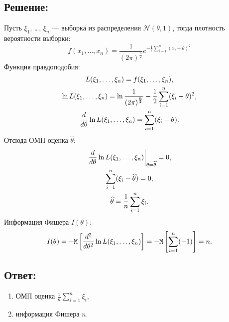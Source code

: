 \documentclass[12pt]{article}
\begin{document}
    \subsection*{Решение:}
    Пусть $\xi_1$, \dots, $\xi_n$ --- выборка из распределения $\mathcal{N} \left ( \theta, 1 \right )$, тогда плотность вероятности выборки:
    \[
        f(x_1, \dots, x_n)
        = \frac{1}{\left ( 2 \pi \right )^\frac{n}{2}} e^{-\frac{1}{2} \sum_{i=1}^n (x_i - \theta)^2}
    \]
    Функция правдоподобия:
    \begin{gather*}
        L(\xi_1, \dots, \xi_n) = f(\xi_1, \dots, \xi_n) , \\
        \ln L(\xi_1, \dots, \xi_n) = \ln \frac{1}{\left ( 2 \pi \right )^\frac{n}{2}} - \frac{1}{2} \sum_{i=1}^n (\xi_i - \theta)^2 , \\
        \frac{d}{d \theta} \ln L(\xi_1, \dots, \xi_n) =  \sum_{i=1}^n (\xi_i - \theta) .
    \end{gather*}
    Отсюда ОМП оценка $\widehat{\theta}$:
    \begin{gather*}
        \left . \frac{d}{d \theta} \ln L(\xi_1, \dots, \xi_n) \right |_{\theta = \widehat{\theta}} = 0 , \\
        \sum_{i=1}^n (\xi_i - \widehat{\theta}) = 0 , \\
        \widehat{\theta} = \frac{1}{n} \sum_{i=1}^n \xi_i .
    \end{gather*}
    Информация Фишера $I(\theta)$:
    \[
        I(\theta)
        = - \mathtt{M} \left [ \frac{d^{2}}{d {\theta}^2} \ln L(\xi_1, \dots, \xi_n) \right ]
        = - \mathtt{M} \left [ \sum_{i=1}^n (-1) \right ]
        = n .
    \]

    \subsection*{Ответ:}
    \begin{enumerate}
        \item ОМП оценка $\frac{1}{n} \sum_{i=1}^n \xi_i$,
        \item информация Фишера $n$.
    \end{enumerate}
\end{document}
